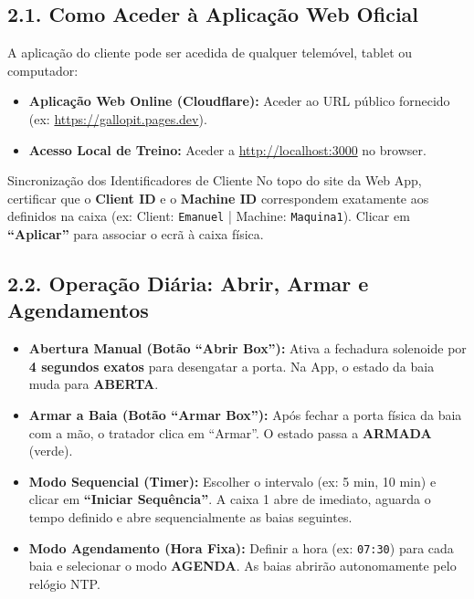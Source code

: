 \documentclass[11pt,a4paper]{article}
\begin{document}
\subsection*{2.1. Como Aceder à Aplicação Web Oficial}
A aplicação do cliente pode ser acedida de qualquer telemóvel, tablet ou computador:
\begin{itemize}[leftmargin=*]
    \item \textbf{Aplicação Web Online (Cloudflare):} Aceder ao URL público fornecido (ex: \url{https://gallopit.pages.dev}).
    \item \textbf{Acesso Local de Treino:} Aceder a \url{http://localhost:3000} no browser.
\end{itemize}

\begin{noteBox}{Sincronização dos Identificadores de Cliente}
No topo do site da Web App, certificar que o \textbf{Client ID} e o \textbf{Machine ID} correspondem exatamente aos definidos na caixa (ex: Client: \texttt{Emanuel} | Machine: \texttt{Maquina1}). Clicar em \textbf{``Aplicar''} para associar o ecrã à caixa física.
\end{noteBox}

\subsection*{2.2. Operação Diária: Abrir, Armar e Agendamentos}
\begin{itemize}[leftmargin=*]
    \item \textbf{Abertura Manual (Botão ``Abrir Box''):} Ativa a fechadura solenoide por \textbf{4 segundos exatos} para desengatar a porta. Na App, o estado da baia muda para \textbf{\textcolor{gallopred}{ABERTA}}.
    \item \textbf{Armar a Baia (Botão ``Armar Box''):} Após fechar a porta física da baia com a mão, o tratador clica em ``Armar''. O estado passa a \textbf{\textcolor{gallopgreen}{ARMADA}} (verde).
    \item \textbf{Modo Sequencial (Timer):} Escolher o intervalo (ex: 5 min, 10 min) e clicar em \textbf{``Iniciar Sequência''}. A caixa 1 abre de imediato, aguarda o tempo definido e abre sequencialmente as baias seguintes.
    \item \textbf{Modo Agendamento (Hora Fixa):} Definir a hora (ex: \texttt{07:30}) para cada baia e selecionar o modo \textbf{AGENDA}. As baias abrirão autonomamente pelo relógio NTP.
\end{itemize}
\end{document}
